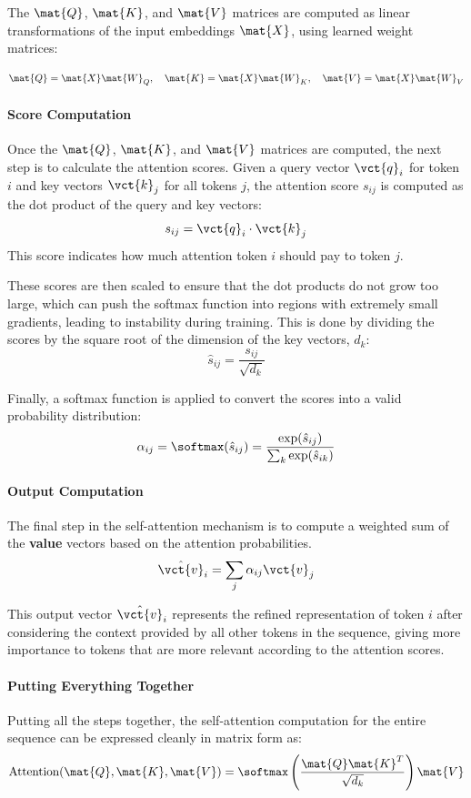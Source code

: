 The \(\mat{Q}\), \(\mat{K}\), and \(\mat{V}\) matrices are computed as linear transformations of the input embeddings \(\mat{X}\), using learned weight matrices:

\[
    \mat{Q} = \mat{X} \mat{W}_Q, \quad
    \mat{K} = \mat{X} \mat{W}_K, \quad
    \mat{V} = \mat{X} \mat{W}_V
\]

\paragraph{Score Computation}
Once the \(\mat{Q}\), \(\mat{K}\), and \(\mat{V}\) matrices are computed, the next step is to calculate the attention scores.
Given a query vector \(\vct{q}_i\) for token \(i\) and key vectors \(\vct{k}_j\) for all tokens \(j\), the attention score \(s_{ij}\) is computed as the dot product of the query and key vectors:
\[
s_{ij} = \vct{q}_i \cdot \vct{k}_j
\]
This score indicates how much attention token \(i\) should pay to token \(j\).

These scores are then scaled to ensure that the dot products do not grow too large, which can push the softmax function into regions with extremely small gradients, leading to instability during training. 
This is done by dividing the scores by the square root of the dimension of the key vectors, \(d_k\):
\[
\hat{s}_{ij} = \frac{s_{ij}}{\sqrt{d_k}}
\]

Finally, a softmax function is applied to convert the scores into a valid probability distribution:
\[
\alpha_{ij} = \softmax(\hat{s}_{ij}) = \frac{\exp(\hat{s}_{ij})}{\sum_{k} \exp(\hat{s}_{ik})}
\]

\paragraph{Output Computation}
The final step in the self-attention mechanism is to compute a weighted sum of the \textbf{value} vectors based on the attention probabilities.
\begin{equation}
    \label{eq:weighted_sum_values}
    \hat{\vct{v}}_i = \sum_{j} \alpha_{ij} \vct{v}_j
\end{equation}

This output vector \(\hat{\vct{v}}_i\) represents the refined representation of token \(i\) after considering the context provided by all other tokens in the sequence, giving more importance to tokens that are more relevant according to the attention scores.

\paragraph{Putting Everything Together}
Putting all the steps together, the self-attention computation for the entire sequence can be expressed cleanly in matrix form as:
\[
\text{Attention}(\mat{Q}, \mat{K}, \mat{V}) = \softmax\left(\frac{\mat{Q} \mat{K}^T}{\sqrt{d_k}}\right) \mat{V}
\]

